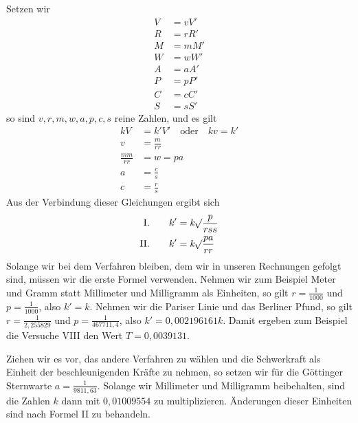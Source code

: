 Setzen wir
\[
\begin{aligned}
V&=vV'\\
R&=rR'\\
M&=mM'\\
W&=wW'\\
A&=aA'\\
P&=pP'\\
C&=cC'\\
S&=sS'
\end{aligned}
\]
so sind $v,r,m,w,a,p,c,s$ reine Zahlen, und es gilt
\[
\begin{aligned}
kV&=k'V'\quad\text{oder}\quad kv=k'\\
v&=\frac m{rr}\\
\frac{mm}{rr}&=w=pa\\
a&=\frac cs\\
c&=\frac rs
\end{aligned}
\]
Aus der Verbindung dieser Gleichungen ergibt sich
\[
\begin{aligned}
\text{I.}\qquad k'&=k\mathord{{}^{}\!\surd}\frac p{rss}\\
\text{II.}\qquad k'&=k\mathord{{}^{}\!\surd}\frac{pa}{rr}
\end{aligned}
\]
Solange wir bei dem Verfahren bleiben, dem wir in unseren Rechnungen gefolgt sind, müssen wir die erste Formel verwenden. Nehmen wir zum Beispiel Meter und Gramm statt Millimeter und Milligramm als Einheiten, so gilt $r=\frac1{1000}$ und $p=\frac1{1000}$, also $k'=k$. Nehmen wir die Pariser Linie und das Berliner Pfund, so gilt $r=\frac1{2{,}255829}$ und $p=\frac1{467711{,}4}$, also $k'=0{,}002196161k$. Damit ergeben zum Beispiel die Versuche VIII den Wert $T=0{,}0039131$.

Ziehen wir es vor, das andere Verfahren zu wählen und die Schwerkraft als Einheit der beschleunigenden Kräfte zu nehmen, so setzen wir für die Göttinger Sternwarte $a=\frac1{9811{,}63}$. Solange wir Millimeter und Milligramm beibehalten, sind die Zahlen $k$ dann mit $0{,}01009554$ zu multiplizieren. Änderungen dieser Einheiten sind nach Formel II zu behandeln.

